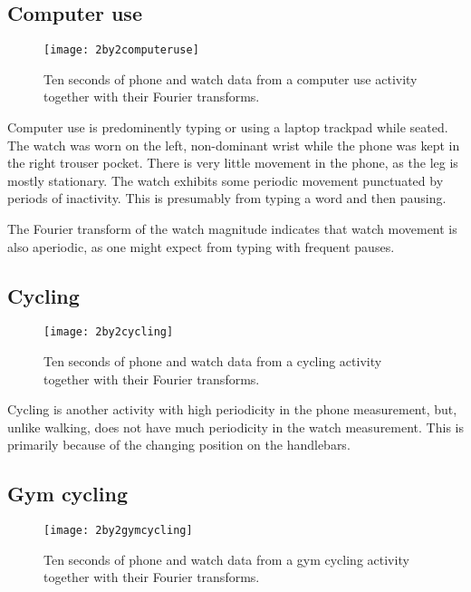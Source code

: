     \subsection{Computer use}
      \begin{figure}[!th]
        \centering
        \texttt{[image: 2by2computeruse]}
        \caption{Ten seconds of phone and watch data from a computer use activity together with their Fourier transforms.}
        \label{fig:2by2computeruse}
      \end{figure}
      
      Computer use is predominently typing or using a laptop trackpad while seated. The watch was worn on the left, non-dominant wrist while the phone was kept in the right trouser pocket. There is very little movement in the phone, as the leg is mostly stationary. The watch exhibits some periodic movement punctuated by periods of inactivity. This is presumably from typing a word and then pausing.
      
      The Fourier transform of the watch magnitude indicates that watch movement is also aperiodic, as one might expect from typing with frequent pauses. 
    \pagebreak[4]
    \subsection{Cycling}
      \begin{figure}[!th]
        \centering
        \texttt{[image: 2by2cycling]}
        \caption{Ten seconds of phone and watch data from a cycling activity together with their Fourier transforms.}
        \label{fig:2by2cycling}
      \end{figure}
      Cycling is another activity with high periodicity in the phone measurement, but, unlike walking, does not have much periodicity in the watch measurement. This is primarily because of the changing position on the handlebars.
    \pagebreak[4]
    \subsection{Gym cycling}
      \begin{figure}[!th]
        \centering
        \texttt{[image: 2by2gymcycling]}
        \caption{Ten seconds of phone and watch data from a gym cycling activity together with their Fourier transforms.}
        \label{fig:2by2gymcycling}
      \end{figure}
      
